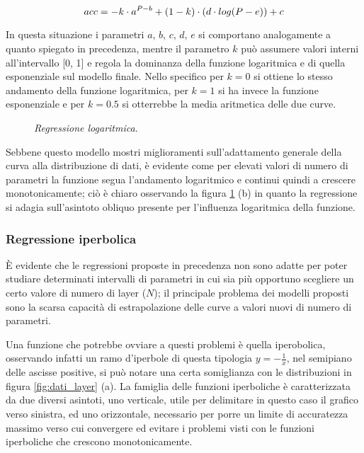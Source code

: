 \begin{equation}
\label{eq:comb2}
    \centering
    acc = -k \cdot a^{P - b} + (1 - k) \cdot (d \cdot log(P - e)) + c
\end{equation}

In questa situazione i parametri $a$, $b$, $c$, $d$, $e$ si comportano analogamente a quanto spiegato in precedenza, mentre il parametro $k$ può assumere valori interni all'intervallo [0, 1] e regola la dominanza della funzione logaritmica e di quella esponenziale sul modello finale. Nello specifico per $k=0$ si ottiene lo stesso andamento della funzione logaritmica, per $k=1$ si ha invece la funzione esponenziale e per $k=0.5$ si otterrebbe la media aritmetica delle due curve.

\begin{figure}[ht]
    \centering
    \quad
    \quad
    \caption{\textit{Regressione logaritmica}.}
    \label{fig:comb_reg}
\end{figure}

Sebbene questo modello mostri miglioramenti sull'adattamento generale della curva alla distribuzione di dati, è evidente come per elevati valori di numero di parametri la funzione segua l'andamento logaritmico e continui quindi a crescere monotonicamente; ciò è chiaro osservando la figura \ref{fig:comb_reg} (b) in quanto la regressione si adagia sull'asintoto obliquo presente per l'influenza logaritmica della funzione.

\subsubsection{Regressione iperbolica}

È evidente che le regressioni proposte in precedenza non sono adatte per poter studiare determinati intervalli di parametri in cui sia più opportuno scegliere un certo valore di numero di layer ($N$); il principale problema dei modelli proposti sono la scarsa capacità di estrapolazione delle curve a valori nuovi di numero di parametri. %

Una funzione che potrebbe ovviare a questi problemi è quella iperobolica, osservando infatti un ramo d'iperbole di questa tipologia $y= -\frac{1}{x}$, nel semipiano delle ascisse positive, si può notare una certa somiglianza con le distribuzioni in figura \ref{fig:dati_layer} (a). La famiglia delle funzioni iperboliche è caratterizzata da due diversi asintoti, uno verticale, utile per delimitare in questo caso il grafico verso sinistra, ed uno orizzontale, necessario per porre un limite di accuratezza massimo verso cui convergere ed evitare i problemi visti con le funzioni iperboliche che crescono monotonicamente. 

